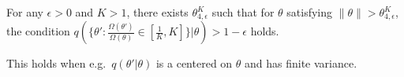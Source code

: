 
\begin{assumption}
For any $\epsilon > 0$ and  $K > 1$, there exists $\theta_{4,\epsilon}^K$ such that 
for $\theta$ satisfying $\| \theta \|  > \theta_{4,\epsilon}^K$, the 
condition
$q(\{\theta':\frac{\Omega(\theta')}{\Omega(\theta)} \in 
  \left[\frac{1}{K}, K\right]\} | \theta) > 1 - \epsilon$ holds.
  \label{asmp:omega}
\end{assumption}
\noindent This holds when e.g.\ $q(\theta'|\theta)$ is a centered on $\theta$ and has 
finite variance.




